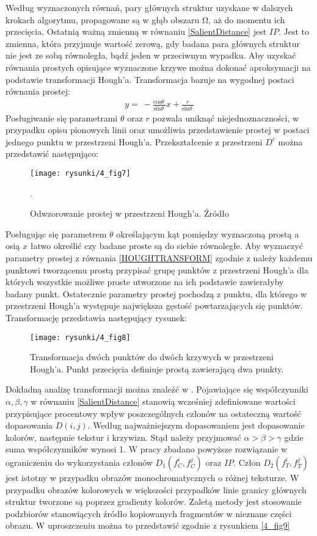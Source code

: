 \documentclass[12pt, twoside, openany]{report}
\theoremstyle{definition}
\begin{document}
Według wyznaczonych równań, pary głównych struktur uzyskane w dalszych krokach algorytmu, propagowane są w głąb obszaru $\mathrm{\Omega }$, aż do momentu ich przecięcia. Ostatnią ważną zmienną w równaniu \eqref{SalientDistance} jest $IP$. Jest to zmienna, która przyjmuje wartość zerową, gdy badana para głównych struktur nie jest ze sobą równoległa, bądź jeden w przeciwnym wypadku. Aby uzyskać równania prostych opisujące wyznaczone krzywe można dokonać aproksymacji na podstawie transformacji Hough'a. Transformacja bazuje na wygodnej postaci równania prostej:
\begin{align}
y=\ -\frac{{\mathrm{cos} \theta \ }}{{\mathrm{sin} \theta \ }}x+\frac{r}{{\mathrm{sin} \theta \ }}
\label{HOUGHTRANSFORM}
\end{align}
Posługiwanie się parametrami $\theta $ oraz $r$ pozwala uniknąć niejednoznaczności, w przypadku opisu pionowych linii oraz umożliwia przedstawienie prostej w postaci jednego punktu w przestrzeni Hough'a. Przekształcenie z przestrzeni $D^c$ można przedstawić następująco:
\begin{figure}[!h]
	\centering
	\texttt{[image: rysunki/4\_fig7]}
	\caption{Odwzorowanie prostej w przestrzeni Hough’a. Źródło \cite{houghTransform}}.
\label{4_fig7}
\end{figure}
Posługując się parametrem $\theta$ określającym kąt pomiędzy wyznaczoną prostą a osią $x$ łatwo określić czy badane proste są do siebie równoległe. Aby wyznaczyć parametry prostej z równania \eqref{HOUGHTRANSFORM} zgodnie z \cite{houghTransform} należy każdemu punktowi tworzącemu prostą przypisać grupę punktów z przestrzeni Hough'a dla których wszystkie możliwe proste utworzone na ich podstawie zawierałyby badany punkt. Ostatecznie parametry prostej pochodzą z punktu, dla którego w przestrzeni Hough'a występuje największa gęstość powtarzających się punktów. Transformację przedstawia następujący rysunek:
\begin{figure}[!h]
	\centering
	\texttt{[image: rysunki/4\_fig8]}
	\caption{Transformacja dwóch punktów do dwóch krzywych w przestrzeni Hough'a. Punkt przecięcia definiuje prostą zawierającą dwa punkty.}
\label{4_fig8}
\end{figure}
Dokładną analizę transformacji można znaleźć w \cite{houghTransform}.
Pojawiające się współczynniki $\alpha ,\beta ,\gamma $ w równaniu \eqref{SalientDistance} stanowią wcześniej zdefiniowane wartości przypisujące procentowy wpływ poszczególnych członów na ostateczną wartość dopasowania $D(i,j)$. Według \cite{SalientStrucTexProp} najważniejszym dopasowaniem jest dopasowanie kolorów, następnie tekstur i krzywizn. Stąd należy przyjmować $\alpha >\beta >\gamma $ gdzie suma współczynników wynosi 1. W pracy zbadano powyższe rozwiązanie w ograniczeniu do wykorzystania członów $D_1\left(f^i_C,f^j_C\right)$ oraz $IP$. Człon $D_2\left(f^i_T,f^j_T\right)$ jest istotny w przypadku obrazów monochromatycznych o różnej teksturze. W przypadku obrazów kolorowych w większości przypadków linie granicy głównych struktur tworzone są poprzez gradienty kolorów. Zaletą metody jest stosowanie podzbiorów stanowiących źródło kopiowanych fragmentów w nieznane części obrazu. W uproszczeniu można to przedstawić zgodnie z rysunkiem \autoref{4_fig9}
\end{document}
